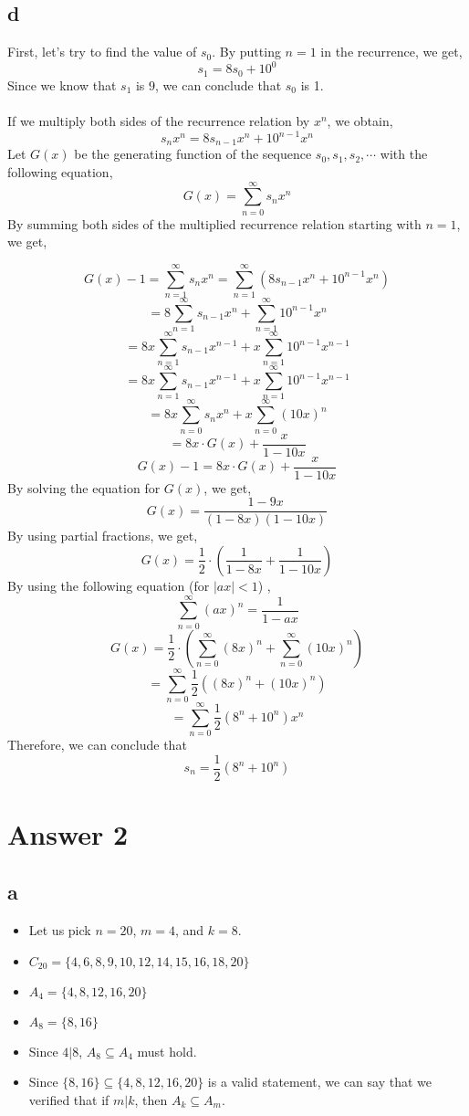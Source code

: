 \documentclass[12pt]{article}
\begin{document}
\subsection*{d}
First, let's try to find the value of $s_0$. By putting $n = 1$ in the recurrence, we get, 
$$ s_1 = 8s_0 + 10^0$$
Since we know that $s_1$ is $9$, we can conclude that $s_0$ is 1. \\ 
\\
If we multiply both sides of the recurrence relation by $x^n$, we obtain, 
$$ s_n x^n = 8s_{n-1} x^n + 10^{n-1} x^n $$ 
Let $G(x)$ be the generating function of the sequence $s_0, s_1, s_2, \dotsb$ with the following equation,
$$ G(x) = \sum\limits_{n=0}^{\infty} s_n x^n$$ 
By summing both sides of the multiplied recurrence relation starting with $n=1$, we get,

$$ G(x) - 1 = \sum\limits_{n=1}^{\infty} s_n x^n = \sum\limits_{n=1}^{\infty} ( 8s_{n-1} x^n + 10^{n-1} x^n ) $$
$$  = 8 \sum\limits_{n=1}^{\infty} s_{n-1} x^n + \sum\limits_{n=1}^{\infty} 10^{n-1} x^n  $$ 
$$  = 8x \sum\limits_{n=1}^{\infty} s_{n-1} x^{n-1} + x \sum\limits_{n=1}^{\infty} 10^{n-1} x^{n-1}  $$ 
$$  = 8x \sum\limits_{n=1}^{\infty} s_{n-1} x^{n-1} + x \sum\limits_{n=1}^{\infty} 10^{n-1} x^{n-1}  $$ 
$$  = 8x \sum\limits_{n=0}^{\infty} s_{n} x^{n} + x \sum\limits_{n=0}^{\infty} (10x)^{n}  $$ 
$$ = 8x \cdot G(x) + \dfrac{x}{1-10x} $$ 
$$ G(x) - 1 = 8x \cdot G(x) + \dfrac{x}{1-10x} $$ 
By solving the equation for $G(x)$, we get, 
$$ G(x) = \dfrac{1-9x}{(1-8x)(1-10x)} $$ 
By using partial fractions, we get, 
$$ G(x) = \dfrac{1}{2} \cdot \left( \dfrac{1}{1-8x} + \dfrac{1}{1-10x} \right) $$ 
By using the following equation (for $ |ax| < 1$) ,
$$  \sum\limits_{n=0}^{\infty} (ax)^{n} = \dfrac{1}{1-ax} $$ 
$$ G(x) = \dfrac{1}{2} \cdot \left(  \sum\limits_{n=0}^{\infty} (8x)^{n} +  \sum\limits_{n=0}^{\infty} (10x)^{n} \right)$$ 
$$ = \sum\limits_{n=0}^{\infty} \dfrac{1}{2} \left( (8x)^{n} +  (10x)^{n} \right) $$ 
$$ = \sum\limits_{n=0}^{\infty} \dfrac{1}{2} (8^n + 10^n)x^{n} $$ 
Therefore, we can conclude that 
$$ s_n = \dfrac{1}{2} \left( 8^n+10^n \right) $$ 


\section*{Answer 2}
\subsection*{a}
\begin{itemize}
    \item Let us pick $n=20$, $m=4$, and $k=8$.
    \item $C_{20}=\{4,6,8,9,10,12,14,15,16,18,20\}$
    \item $A_4=\{4,8,12,16,20\}$
    \item $A_8=\{8,16\}$
    \item Since $4 | 8$, $A_8 \subseteq A_4$ must hold. 
    \item Since $\{8,16\} \subseteq \{4,8,12,16,20\}$ is a valid statement, we can say that we verified that if $m|k$, then $A_k \subseteq A_m$.
\end{itemize}
\end{document}
